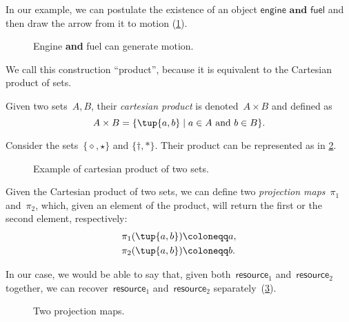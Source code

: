 In our example, we can postulate the existence of an object $\mathsf{engine} \textbf{ and }\mathsf{fuel}$ and then draw the arrow from it to motion (\cref{fig:e13}).

\begin{figure}[h!]
    \centering
    \caption{Engine \textbf{and} fuel can generate motion. \label{fig:e13}}
\end{figure}

We call this construction ``product'', because it is equivalent to the Cartesian product of sets.

\begin{definition}
\label{def:cartesian-product}
   Given two sets~$A,B$, their \emph{cartesian product} is denoted~$A\times  B$
   and defined as 
   \begin{equation}
       A\times  B=\{ \tup{a,b}\mid a\in A\text{ and } b\in B\}.
   \end{equation}
\end{definition}

\begin{example}
Consider the sets~$\{\diamond,\star\}$ and $\{\dagger, \ast\}$. Their product can be represented as in \cref{fig:cartesian-product}.
\begin{figure}[h!]
    \centering
    \caption{Example of cartesian product of two sets.\label{fig:cartesian-product}}
\end{figure}
\end{example}

Given the Cartesian product of two sets, we can define two \emph{projection maps}~$\pi_1$ and~$\pi_2$, which, given an element of the product, will return the first or the second element, respectively:
\begin{equation}
\begin{aligned}
    \pi_1(\tup{a,b}) &\coloneqq a,\\
    \pi_2(\tup{a,b}) &\coloneqq b.
\end{aligned}
\end{equation}

In our case, we would be able to say that, given both~$\mathsf{resource}_1$ and~$\mathsf{resource}_2$ together, we can recover~$\mathsf{resource}_1$ and~$\mathsf{resource}_2$ separately~(\cref{fig:resource-product}).

\begin{figure}[h!]
    \centering
    \caption{Two projection maps. \label{fig:resource-product}}
\end{figure}


